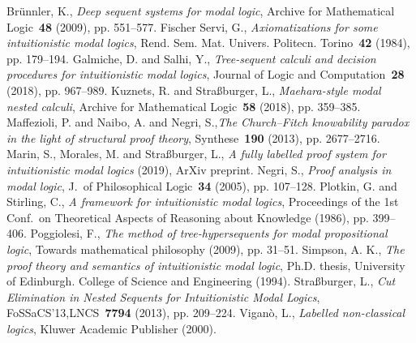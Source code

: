 \documentclass[twoside]{aiml20}
\begin{document}
\begin{thebibliography}{}
	Br{\"u}nnler, K., \emph{Deep sequent systems for modal logic}, Archive for Mathematical Logic~\textbf{48} (2009), pp. 551--577.
	Fischer Servi, G., \emph{Axiomatizations for some intuitionistic modal logics}, Rend. Sem. Mat. Univers. Politecn. Torino~\textbf{42} (1984), pp. 179--194.
	Galmiche, D. and Salhi, Y., \emph{Tree-sequent calculi and decision procedures for intuitionistic modal logics}, Journal of Logic and Computation~\textbf{28} (2018), pp. 967--989.
	 Kuznets, R. and Stra{\ss}burger, L., \emph{Maehara-style modal nested calculi}, Archive for Mathematical Logic~\textbf{58} (2018), pp. 359--385.
	 Maffezioli, P. and Naibo, A. and Negri, S.,\emph{The {C}hurch--{F}itch knowability paradox in the light of structural proof theory}, Synthese~\textbf{190} (2013), pp. 2677--2716.
	 Marin, S., Morales, M. and Stra{\ss}burger, L., \emph{A fully labelled proof system for intuitionistic modal logics} (2019), ArXiv preprint.
	 Negri, S., \emph{Proof analysis in modal logic}, J.~of Philosophical Logic~\textbf{34} (2005), pp. 107--128.
	 Plotkin, G. and Stirling, C., \emph{A framework for intuitionistic modal logics}, Proceedings of the 1st Conf.~on Theoretical Aspects of Reasoning about Knowledge (1986), pp. 399--406.
	 Poggiolesi, F., \emph{The method of tree-hypersequents for modal propositional logic}, Towards mathematical philosophy (2009), pp. 31--51.
	 Simpson, A. K., \emph{The proof theory and semantics of intuitionistic modal logic}, Ph.D. thesis, University of Edinburgh. College of Science and Engineering (1994).
	 Stra{\ss}burger, L., \emph{Cut Elimination in Nested Sequents for Intuitionistic Modal Logics}, FoSSaCS'13,LNCS~\textbf{7794} (2013), pp. 209--224.
	Vigan\`o, L., \emph{Labelled non-classical logics}, Kluwer Academic Publisher (2000).
\end{thebibliography}
\end{document}
